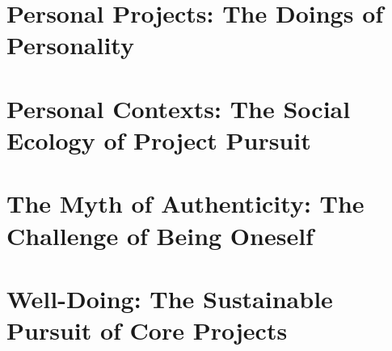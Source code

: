 \documentclass{article}
\numberwithin{equation}{section}
\begin{document}
\section{Personal Projects: The Doings of Personality}



\section{Personal Contexts: The Social Ecology of Project Pursuit}


\section{The Myth of Authenticity: The Challenge of Being Oneself}


\section{Well-Doing: The Sustainable Pursuit of Core Projects}


\printbibliography[heading=bibintoc]
	
\end{document}

